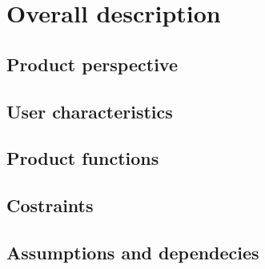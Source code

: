 \section{Overall description}
	\subsection{Product perspective}
	\subsection{User characteristics}
	\subsection{Product functions}
	\subsection{Costraints}
	\subsection{Assumptions and dependecies}
	
